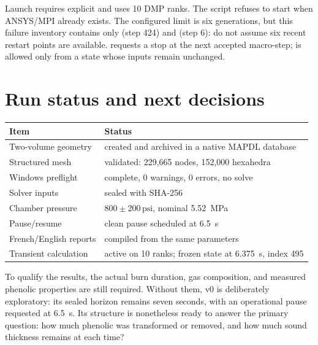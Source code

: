 \documentclass[oneside,openany]{amsdtx}
\begin{document}
Launch requires explicit  and uses 10 DMP ranks. The script refuses
to start when ANSYS/MPI already exists. The configured limit is six generations,
but this failure inventory contains only  (step 424) and 
(step 6): do not assume six recent restart points are available.
 requests a stop at the next accepted macro-step;
 is allowed only from a  state
whose inputs remain unchanged.

\section{Run status and next decisions}
\begin{table}[H]\centering
\begin{tabular}{L{7.2cm}L{5.4cm}}\toprule
Item & Status\\\midrule
Two-volume geometry & created and archived in a native MAPDL database\\
Structured mesh & validated: 229,665 nodes, 152,000 hexahedra\\
Windows preflight & complete, 0 warnings, 0 errors, no solve\\
Solver inputs & sealed with SHA-256\\
Chamber pressure & \(800\pm200\,\mathrm{psi}\), nominal \SI{5.52}{MPa}\\
Pause/resume & clean pause scheduled at \SI{6.5}{s}\\
French/English reports & compiled from the same parameters\\
Transient calculation & active on 10 ranks; frozen state at \SI{6.375}{s}, index 495\\\bottomrule
\end{tabular}
\end{table}

To qualify the results, the actual burn duration, gas composition, and measured
phenolic properties are still required. Without them, v0 is
deliberately exploratory: its sealed horizon remains seven seconds, with an
operational pause requested at \SI{6.5}{s}. Its structure is nonetheless
ready to answer the primary question: how much phenolic was transformed or
removed, and how much sound thickness remains at each time?
\end{document}
